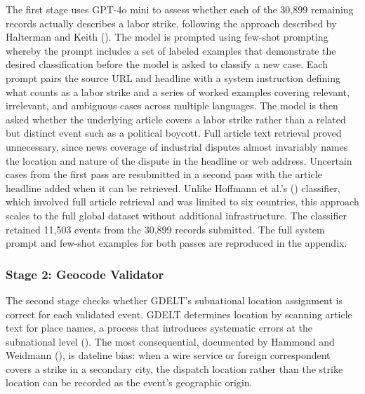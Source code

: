 \documentclass[
  11pt,
]{article}
\begin{document}
The first stage uses GPT-4o mini to assess whether each of the 30,899
remaining records actually describes a labor strike, following the
approach described by Halterman and Keith
(). The model is prompted using
few-shot prompting whereby the prompt includes a set of labeled examples
that demonstrate the desired classification before the model is asked to
classify a new case. Each prompt pairs the source URL and headline with
a system instruction defining what counts as a labor strike and a series
of worked examples covering relevant, irrelevant, and ambiguous cases
across multiple languages. The model is then asked whether the
underlying article covers a labor strike rather than a related but
distinct event such as a political boycott. Full article text retrieval
proved unnecessary, since news coverage of industrial disputes almost
invariably names the location and nature of the dispute in the headline
or web address. Uncertain cases from the first pass are resubmitted in a
second pass with the article headline added when it can be retrieved.
Unlike Hoffmann et al.'s () classifier,
which involved full article retrieval and was limited to six countries,
this approach scales to the full global dataset without additional
infrastructure. The classifier retained 11,503 events from the 30,899
records submitted. The full system prompt and few-shot examples for both
passes are reproduced in the appendix.

\subsubsection{Stage 2: Geocode
Validator}\label{stage-2-geocode-validator}

The second stage checks whether GDELT's subnational location assignment
is correct for each validated event. GDELT determines location by
scanning article text for place names, a process that introduces
systematic errors at the subnational level
(). The most
consequential, documented by Hammond and Weidmann
(), is dateline bias: when a wire
service or foreign correspondent covers a strike in a secondary city,
the dispatch location rather than the strike location can be recorded as
the event's geographic origin.
\end{document}
